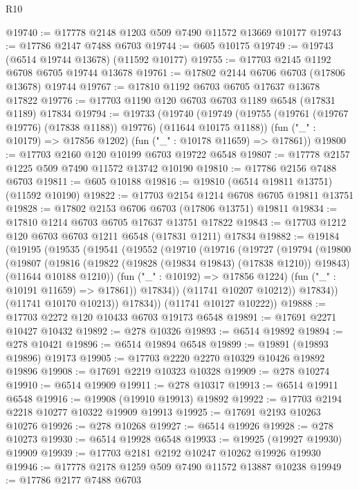 \begin{lexlean}{R10}
\begin{coremodule}
@19740 := @17778 @2148 @1203 @509 @7490 @11572 @13669 @10177
@19743 := @17786 @2147 @7488 @6703
@19744 := @605 @10175
@19749 := @19743 (@6514 @19744 @13678) (@11592 @10177)
@19755 := @17703 @2145 @1192 @6708 @6705 @19744 @13678
@19761 := @17802 @2144 @6706 @6703 (@17806 @13678) @19744
@19767 := @17810 @1192 @6703 @6705 @17637 @13678 @17822
@19776 := @17703 @1190 @120 @6703 @6703 @1189 @6548 (@17831 @1189) @17834
@19794 := @19733
    (@19740
      (@19749 (@19755 (@19761 (@19767 @19776) (@17838 @1188)) @19776) (@11644 @10175 @1188))
      (fun ("_" : @10179) => @17856 @1202)
      (fun ("_" : @10178 @11659) => @17861))
@19800 := @17703 @2160 @120 @10199 @6703 @19722 @6548
@19807 := @17778 @2157 @1225 @509 @7490 @11572 @13742 @10190
@19810 := @17786 @2156 @7488 @6703
@19811 := @605 @10188
@19816 := @19810 (@6514 @19811 @13751) (@11592 @10190)
@19822 := @17703 @2154 @1214 @6708 @6705 @19811 @13751
@19828 := @17802 @2153 @6706 @6703 (@17806 @13751) @19811
@19834 := @17810 @1214 @6703 @6705 @17637 @13751 @17822
@19843 := @17703 @1212 @120 @6703 @6703 @1211 @6548 (@17831 @1211) @17834
@19882 := @19184
    (@19195
      (@19535
        (@19541
          (@19552
            (@19710
              (@19716
                (@19727
                  (@19794
                    (@19800
                      (@19807
                        (@19816
                          (@19822 (@19828 (@19834 @19843) (@17838 @1210)) @19843)
                          (@11644 @10188 @1210))
                        (fun ("_" : @10192) => @17856 @1224)
                        (fun ("_" : @10191 @11659) => @17861))
                      @17834))
                  (@11741 @10207 @10212))
                @17834))
            (@11741 @10170 @10213))
          @17834))
      (@11741 @10127 @10222))
@19888 := @17703 @2272 @120 @10433 @6703 @19173 @6548
@19891 := @17691 @2271 @10427 @10432
@19892 := @278 @10326
@19893 := @6514 @19892
@19894 := @278 @10421
@19896 := @6514 @19894 @6548
@19899 := @19891 (@19893 @19896) @19173
@19905 := @17703 @2220 @2270 @10329 @10426 @19892 @19896
@19908 := @17691 @2219 @10323 @10328
@19909 := @278 @10274
@19910 := @6514 @19909
@19911 := @278 @10317
@19913 := @6514 @19911 @6548
@19916 := @19908 (@19910 @19913) @19892
@19922 := @17703 @2194 @2218 @10277 @10322 @19909 @19913
@19925 := @17691 @2193 @10263 @10276
@19926 := @278 @10268
@19927 := @6514 @19926
@19928 := @278 @10273
@19930 := @6514 @19928 @6548
@19933 := @19925 (@19927 @19930) @19909
@19939 := @17703 @2181 @2192 @10247 @10262 @19926 @19930
@19946 := @17778 @2178 @1259 @509 @7490 @11572 @13887 @10238
@19949 := @17786 @2177 @7488 @6703

\end{coremodule}
\end{lexlean}

